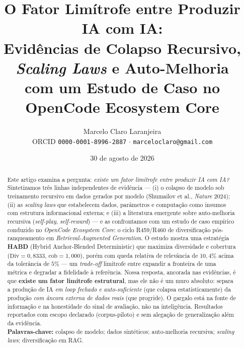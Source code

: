 \documentclass[11pt,a4paper]{article}
\title{\textbf{O Fator Limítrofe entre Produzir IA com IA:\\[3pt]
Evidências de Colapso Recursivo, \emph{Scaling Laws} e Auto-Melhoria\\
com um Estudo de Caso no OpenCode Ecosystem Core}}
\author{Marcelo Claro Laranjeira\\[2pt]
\small ORCID \texttt{0000-0001-8996-2887} \;$\cdot$\; \texttt{marceloclaro@gmail.com}}
\date{30 de agosto de 2026}
\newcommand{\Div}{\mathrm{Div}}
\newcommand{\cob}{\mathrm{cob}}
\begin{document}
\maketitle

\begin{abstract}
\noindent
Este artigo examina a pergunta: \emph{existe um fator limítrofe entre produzir
IA com IA?} Sintetizamos três linhas independentes de evidência --- (i) o
colapso de modelo sob treinamento recursivo em dados gerados por modelo
(Shumailov et al., \emph{Nature} 2024); (ii) as \emph{scaling laws} que
estabelecem dados, parâmetros e computação como insumos com estrutura
informacional externa; e (iii) a literatura emergente sobre auto-melhoria
recursiva (\emph{self-play}, \emph{self-reward}) --- e as confrontamos com um
estudo de caso empírico conduzido no \emph{OpenCode Ecosystem Core}: o ciclo
R459/R460 de diversificação pós-ranqueamento em \emph{Retrieval-Augmented
Generation}. O estudo mostra uma estratégia \textbf{HABD} (Hybrid Anchor-Blended
Deterministic) que maximiza diversidade e cobertura ($\Div{=}0{,}8333$,
$\cob{=}1{,}000$), porém com queda relativa de relevância de $10{,}4\%$ acima da
tolerância de $5\%$ --- um \emph{trade-off} limítrofe entre expandir a fronteira
de uma métrica e degradar a fidelidade à referência. Nossa resposta, ancorada
nas evidências, é que \textbf{existe um fator limítrofe estrutural}, mas ele não
é um muro absoluto: separa a produção de IA \emph{em loop fechado e
auto-suficiente} (que colapsa estatisticamente) da produção \emph{com âncora
externa de dados reais} (que progride). O gargalo está na fonte de informação e
na honestidade do sinal de avaliação, não na inteligência. Resultados reportados
com escopo declarado (corpus-piloto) e sem alegação de generalização além da
evidência.
\\[4pt]
\textbf{Palavras-chave:} colapso de modelo; dados sintéticos; auto-melhoria
recursiva; \emph{scaling laws}; diversificação em RAG.
\end{abstract}

\tableofcontents








\printbibliography
\end{document}

